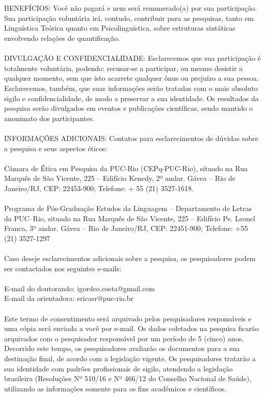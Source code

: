 \\
\\
BENEFÍCIOS: Você não pagará e nem será remunerado(a) por sua participação. Sua participação voluntária irá, contudo, contribuir para as pesquisas, tanto em Linguística Teórica quanto em Psicolinguística, sobre estruturas sintáticas envolvendo relações de quantificação.
\\
\\
DIVULGAÇÃO E CONFIDENCIALIDADE: Esclarecemos que sua participação é totalmente voluntária, podendo: recusar-se a participar, ou mesmo desistir a qualquer momento, sem que isto acarrete qualquer ônus ou prejuízo a sua pessoa. Esclarecemos, também, que suas informações serão tratadas com o mais absoluto sigilo e confidencialidade, de modo a preservar a sua identidade. Os resultados da pesquisa serão divulgados em eventos e publicações científicas, sendo mantido o anonimato dos participantes.
\\
\\
INFORMAÇÕES ADICIONAIS: Contatos para esclarecimentos de dúvidas sobre a pesquisa e seus aspectos éticos:
\\
\\
Câmara de Ética em Pesquisa da PUC-Rio (CEPq-PUC-Rio), situado  na Rua Marquês de São Vicente, 225 -- Edifício Kenedy, 2º andar. Gávea -- Rio de Janeiro/RJ, CEP: 22453-900; Telefone: + 55 (21) 3527-1618.
\\
\\
Programa de Pós-Graduação Estudos da Linguagem -- Departamento de Letras da PUC--Rio, situado na Rua Marquês de São Vicente, 225 -- Edifício Pe. Leonel Franca, 3º andar. Gávea -- Rio de Janeiro/RJ, CEP: 22451-900; Telefone: +55 (21) 3527-1297
\\
\\
Caso deseje esclarecimentos adicionais sobre a pesquisa, os pesquisadores podem ser contactados nos seguintes e-mails:
\\
\\
E-mail do doutorando: igordeo.costa@gmail.com \\
E-mail da orientadora: ericasr@puc-rio.br
\\
\\
Este termo de consentimento será arquivado pelos pesquisadores responsáveis e uma cópia será enviada a você por e-mail. Os dados coletados na pesquisa ficarão arquivados com o pesquisador responsável por um período de 5 (cinco) anos. Decorrido este tempo, os pesquisadores avaliarão os documentos para a sua destinação final, de acordo com a legislação vigente. Os pesquisadores tratarão a sua identidade com padrões profissionais de sigilo, atendendo a legislação brasileira (Resoluções Nº 510/16 e Nº 466/12 do Conselho Nacional de Saúde), utilizando as informações somente para os fins acadêmicos e científicos.
